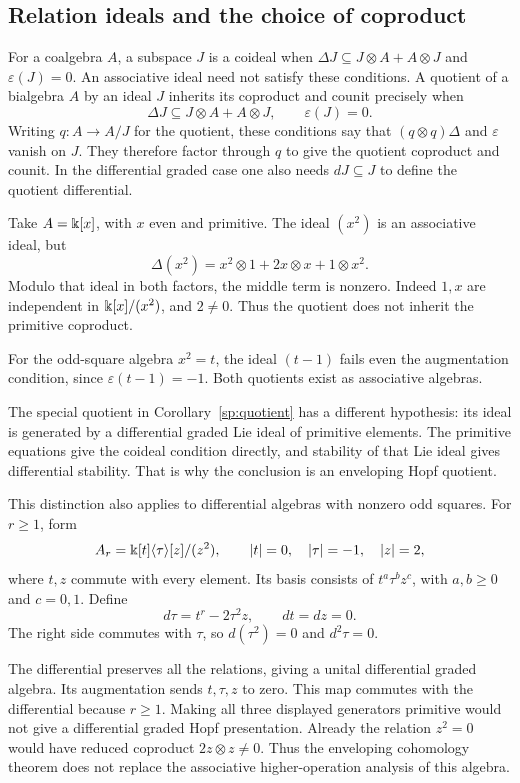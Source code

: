 \subsection{Relation ideals and the choice of coproduct}
\label{sec:olb-relation-ideals}

For a coalgebra $A$, a subspace $J$ is a coideal when
$\Delta J\subseteq J\otimes A+A\otimes J$ and
$\varepsilon(J)=0$.  An associative ideal need not satisfy
these conditions.  A quotient of a bialgebra $A$ by an ideal
$J$ inherits its coproduct and counit precisely when
\[
 \Delta J\subseteq J\otimes A+A\otimes J,
 \qquad \varepsilon(J)=0.
\]
Writing $q:A\to A/J$ for the quotient, these conditions say that
$(q\otimes q)\Delta$ and $\varepsilon$ vanish on $J$. They therefore
factor through $q$ to give the quotient coproduct and counit.  In the differential graded case one
also needs $dJ\subseteq J$ to define the quotient differential.

Take $A=\Bbbk[x]$, with $x$ even and primitive.
The ideal $(x^2)$ is an associative ideal, but
\[
 \Delta(x^2)=x^2\otimes1+2x\otimes x+1\otimes x^2.
\]
Modulo that ideal in both factors, the middle term is nonzero.
Indeed $1,x$ are independent in $\Bbbk[x]/(x^2)$, and $2\ne0$.
Thus the quotient does not inherit the primitive coproduct.

For the odd-square algebra $x^2=t$, the ideal $(t-1)$ fails
even the augmentation condition, since $\varepsilon(t-1)=-1$.
Both quotients exist as associative algebras.

The special quotient in Corollary~\ref{sp:quotient} has a
different hypothesis: its ideal is generated by a differential
graded Lie ideal of primitive elements.
The primitive equations give the coideal condition directly,
and stability of that Lie ideal gives differential stability.
That is why the conclusion is an enveloping Hopf quotient.

This distinction also applies to differential algebras with
nonzero odd squares.  For $r\geq1$, form
\[
 A_r=\Bbbk[t]\langle\tau\rangle[z]/(z^2),\qquad
 |t|=0,\quad|\tau|=-1,\quad|z|=2,
\]
where $t,z$ commute with every element.
Its basis consists of $t^a\tau^bz^c$, with $a,b\geq0$ and
$c=0,1$.  Define
\[
 d\tau=t^r-2\tau^2z,\qquad dt=dz=0.
\]
The right side commutes with $\tau$, so $d(\tau^2)=0$ and
$d^2\tau=0$.

The differential preserves all the relations, giving a unital
differential graded algebra. Its augmentation sends $t,\tau,z$ to
zero. This map commutes with the differential because $r\geq1$.
Making all three displayed generators primitive would not
give a differential graded Hopf presentation.
Already the relation $z^2=0$ would have reduced coproduct
$2z\otimes z\ne0$.
Thus the enveloping cohomology theorem does not replace the
associative higher-operation analysis of this algebra.

